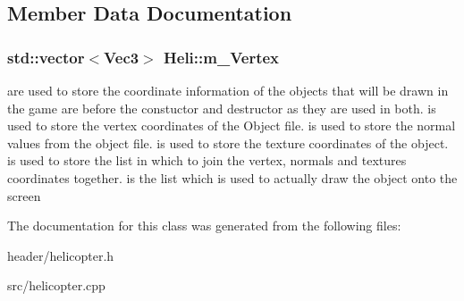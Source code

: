 \subsection{Member Data Documentation}
\hypertarget{classHeli_a56fb01569dcca41ad98e4b847ea883bd}{
\subsubsection[{m\_\-Vertex}]{\setlength{\rightskip}{0pt plus 5cm}std::vector$<${\bf Vec3}$>$ {\bf Heli::m\_\-Vertex}}}
\label{classHeli_a56fb01569dcca41ad98e4b847ea883bd}
are used to store the coordinate information of the objects that will be drawn in the game  are before the constuctor and destructor as they are used in both.  is used to store the vertex coordinates of the Object file.  is used to store the normal values from the object file.  is used to store the texture coordinates of the object.  is used to store the list in which to join the vertex, normals and textures coordinates together.  is the list which is used to actually draw the object onto the screen 

The documentation for this class was generated from the following files:\begin{DoxyCompactItemize}
\item 
header/helicopter.h\item 
src/helicopter.cpp\end{DoxyCompactItemize}
